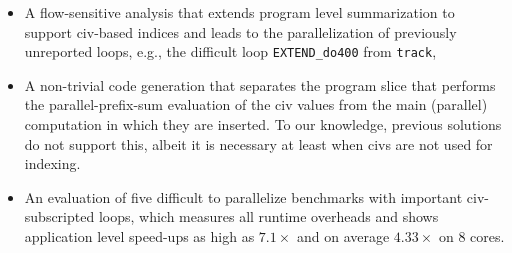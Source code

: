 \documentclass{sig-alternate}
\begin{document}
\begin{itemize}
    \item A flow-sensitive analysis that extends %
            program level summarization to support {\sc civ}-based 
            indices and leads to the parallelization of
            previously unreported loops, e.g., the difficult 
            loop {\tt EXTEND\_do400} from {\tt track},

    \item A non-trivial code generation that separates the 
            program slice that performs the parallel-prefix-sum
            evaluation of the {\sc civ} values 
            from the main (parallel) computation in which 
            they are inserted. To our knowledge, previous
            solutions do not support this, albeit it is 
            necessary at least when {\sc civ}s are not used for indexing.
            

    \item An evaluation of five difficult to parallelize benchmarks 
            with important {\sc civ}-subscripted loops, which measures 
            all runtime overheads and shows application level speed-ups 
            as high as $7.1\times$ and on average $4.33\times$ on $8$ cores.
%
\end  {itemize}






\end{document}
